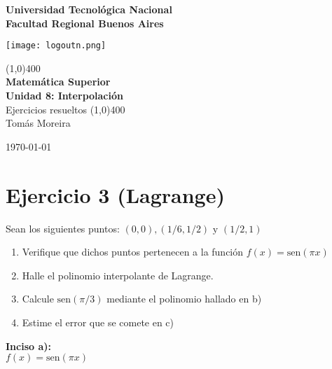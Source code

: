 \documentclass[11pt]{article}
\def\sen{\mathrm{sen}}
\begin{document}
		
	\begin{titlepage}
		\begin{center}
			\vspace*{0.5cm}
			\Large{\textbf{Universidad Tecnológica Nacional}}\\
			\Large{\textbf{Facultad Regional Buenos Aires}}\\
			\begin{center}
				\texttt{[image: logoutn.png]}
			\end{center}
			\vfill
			\line(1,0){400}\\
			\vspace*{0.3cm}
			\huge{\textbf{Matemática Superior}}\\
			\Large{\textbf{Unidad 8: Interpolación}}\\
			\large{Ejercicios resueltos}
			\line(1,0){400}\\
			\vfill
			Tomás Moreira \\
			
			
			\today
				
				
		\end{center}
	\end{titlepage}

	\tableofcontents
	\thispagestyle{empty}
	\clearpage

	\setcounter{page}{1}
	
	\section{Ejercicio 3 (Lagrange)}
	Sean los siguientes puntos: $(0,0), (1/6, 1/2) \text{ y } (1/2, 1)$
	
	\begin{enumerate}[label=\alph*)]
		\item Verifique que dichos puntos pertenecen a la función $f(x)=\sen(\pi x)$
		\item Halle el polinomio interpolante de Lagrange.
		\item Calcule $\sen(\pi/3)$ mediante el polinomio hallado en b)
		\item Estime el error que se comete en c)
	\end{enumerate}

	\textbf{Inciso a):}\\
	$f(x)=\sen(\pi x)$
	
\end{document}

